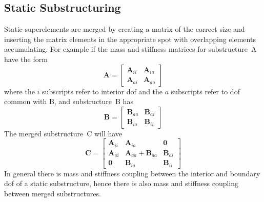\documentclass[10pt,openany,twoside]{book}
\numberwithin{equation}{section}   %
\newcommand{\Matrix}[1]{\boldsymbol{#1}}
\newcommand{\Ss}{substructure}
\newcommand{\Sss}{substructures}
\begin{document}
\subsection{\label{sect:static-ss}Static Substructuring}
\par
Static superelements are merged by creating a matrix of the correct size
and inserting the matrix elements in the appropriate spot with
overlapping elements accumulating.
For example if the mass and stiffness matrices for \Ss\ A have the form
\begin{equation}
\Matrix{A} = \left[
\begin{array}{cc}
   \Matrix{A}_{ii} & \Matrix{A}_{ia} \\
   \Matrix{A}_{ai} & \Matrix{A}_{aa}
\end{array}
\right]	\nonumber
\end{equation}
where the $i$ subscripts refer to interior dof and the $a$
subscripts refer to dof common with B, and \Ss\ B has
\begin{equation}
\Matrix{B} = \left[
\begin{array}{cc}
   \Matrix{B}_{aa} & \Matrix{B}_{ai} \\
   \Matrix{B}_{ia} & \Matrix{B}_{ii}
\end{array}
\right]	\nonumber
\end{equation}
The merged \Ss\ C will have
\begin{equation}\label{eqn:merged-ss}
\Matrix{C} = \left[
\begin{array}{ccc}
   \Matrix{A}_{ii} & \Matrix{A}_{ia} & \Matrix{0} \\
   \Matrix{A}_{ai} & \Matrix{A}_{aa} + \Matrix{B}_{aa} & \Matrix{B}_{ai} \\
   \Matrix{0} & \Matrix{B}_{ia} & \Matrix{B}_{ii}
\end{array}
\right]
\end{equation}
In general there is mass and stiffness coupling between the
interior and boundary dof of a static \Ss, hence
there is also mass and stiffness coupling between
merged \Sss.
\end{document}
